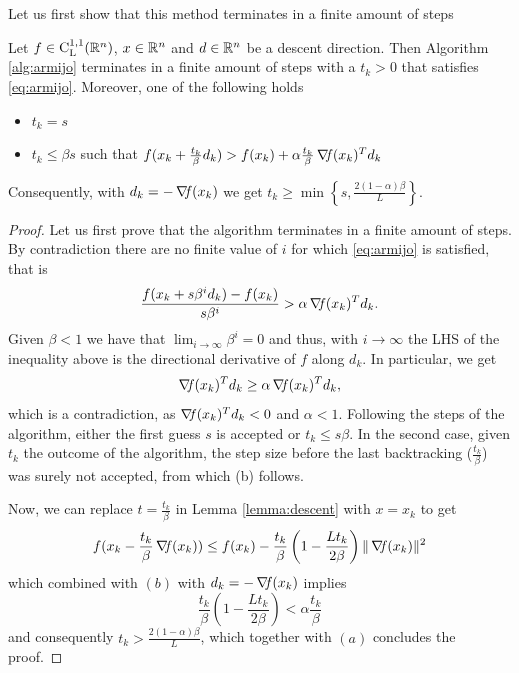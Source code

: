 \documentclass[10pt,a4paper]{article}
\begin{document}
\noindent Let us first show that this method terminates in a finite amount of steps
\begin{lemma} \label{lemma:finite_termination}
	Let $f\in \mathord{\mathrm{C^{1,1}_{L}}}(\mathbb{R}^n)$, $x\in \mathbb{R}^n$ and $d\in \mathbb{R}^n$ be a descent direction. Then Algorithm \ref{alg:armijo} terminates in a finite amount of steps with a $t_k>0$ that satisfies \eqref{eq:armijo}. Moreover, one of the following holds
	\begin{itemize}
		\item[(a)] $t_k=s$
		\item[(b)] $t_k\leq \beta s$ such that $f(x_k +\frac{t_k}{\beta} d_k) > f(x_k) + \alpha \frac{t_k}{\beta} \operatorname*{\mathit{\nabla \!f}}(x_k)^Td_k$
	\end{itemize}
Consequently, with $d_k = -\operatorname*{\mathit{\nabla \!f}}(x_k)$ we get $t_k \geq \min \left\{s, \frac{2(1-\alpha)\beta}{L} \right \}$.
\end{lemma}
\begin{proof}
	Let us first prove that the algorithm terminates in a finite amount of steps. By contradiction there are no finite value of $i$ for which \eqref{eq:armijo} is satisfied, that is 
	\begin{equation*}
		\frac{f(x_k +s \beta^i d_k)- f(x_k)}{s \beta^i} > \alpha \operatorname*{\mathit{\nabla \!f}}(x_k)^Td_k.
	\end{equation*}
Given $\beta<1$ we have that $\lim_{i\to \infty} \beta^i =0$ and thus, with $i\to \infty$ the LHS of the inequality above is the directional derivative of $f$ along $d_k$. In particular, we get
\begin{equation*}
	\operatorname*{\mathit{\nabla \!f}}(x_k)^Td_k \geq \alpha\operatorname*{\mathit{\nabla \!f}}(x_k)^Td_k,
\end{equation*}
which is a contradiction, as $\operatorname*{\mathit{\nabla \!f}}(x_k)^Td_k<0$ and $\alpha <1$.
Following the steps of the algorithm, either the first guess $s$ is accepted or $t_k\leq s\beta$. In the second case, given $t_k$ the outcome of the algorithm, the step size before the last backtracking ($\frac{t_k}{\beta}$) was surely not accepted, from which (b) follows.
\par Now, we can replace $t=\frac{t_k}{\beta}$ in Lemma \ref{lemma:descent} with $x=x_k$ to get
\begin{equation*}
	f(x_k -\frac{t_k}{\beta} \operatorname*{\mathit{\nabla \!f}}(x_k)) \leq f(x_k) - \frac{t_k}{\beta} \left(1-\frac{L t_k}{2\beta}\right) \| \operatorname*{\mathit{\nabla \!f}}(x_k)\|^2
\end{equation*}
which combined with $(b)$ with $d_k=-\operatorname*{\mathit{\nabla \!f}}(x_k)$ implies
\begin{equation*}
	\frac{t_k}{\beta}\left(1-\frac{L t_k}{2\beta}\right) < \alpha\frac{t_k}{\beta}
\end{equation*}
and consequently $t_k>\frac{2(1-\alpha)\beta}{L}$, which together with $(a)$ concludes the proof.
\end{proof}
\end{document}
